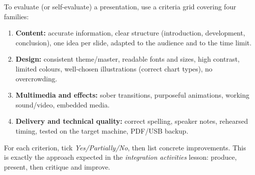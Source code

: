 \documentclass[11pt]{article}
\begin{document}
\begin{methode}
To evaluate (or self-evaluate) a presentation, use a criteria grid covering four families:
\begin{enumerate}
\item \textbf{Content:} accurate information, clear structure (introduction, development, conclusion), one idea per slide, adapted to the audience and to the time limit.
\item \textbf{Design:} consistent theme/master, readable fonts and sizes, high contrast, limited colours, well-chosen illustrations (correct chart types), no overcrowding.
\item \textbf{Multimedia and effects:} sober transitions, purposeful animations, working sound/video, embedded media.
\item \textbf{Delivery and technical quality:} correct spelling, speaker notes, rehearsed timing, tested on the target machine, PDF/USB backup.
\end{enumerate}
For each criterion, tick \emph{Yes/Partially/No}, then list concrete improvements. This is exactly the approach expected in the \emph{integration activities} lesson: produce, present, then critique and improve.
\end{methode}
\end{document}
